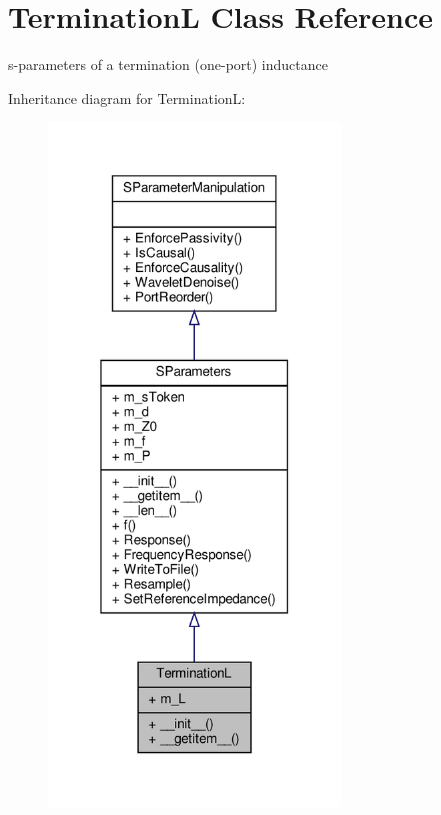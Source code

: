 \hypertarget{classSignalIntegrity_1_1SParameters_1_1Devices_1_1TerminationL_1_1TerminationL}{}\section{TerminationL Class Reference}
\label{classSignalIntegrity_1_1SParameters_1_1Devices_1_1TerminationL_1_1TerminationL}


s-\/parameters of a termination (one-\/port) inductance  




Inheritance diagram for TerminationL\+:\nopagebreak
\begin{figure}[H]
\begin{center}
\leavevmode
\includegraphics[width=220pt]{classSignalIntegrity_1_1SParameters_1_1Devices_1_1TerminationL_1_1TerminationL__inherit__graph}
\end{center}
\end{figure}


